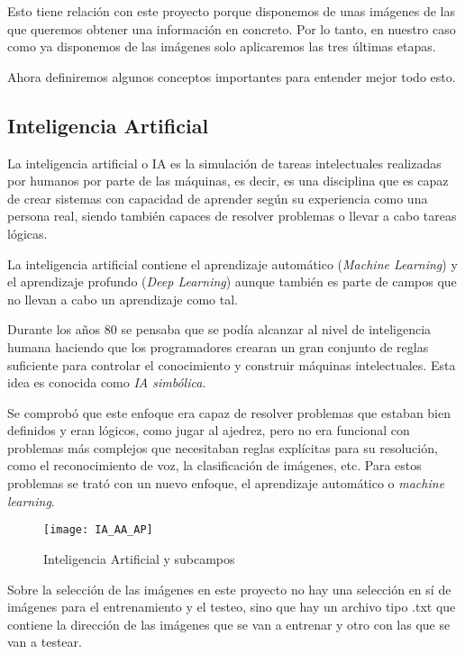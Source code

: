 Esto tiene relación con este proyecto porque disponemos de unas imágenes de las que queremos obtener una información en concreto. Por lo tanto, en nuestro caso como ya disponemos de las imágenes solo aplicaremos las tres últimas etapas.

Ahora definiremos algunos conceptos importantes para entender mejor todo esto.

\subsection{Inteligencia Artificial}

La inteligencia artificial o IA es la simulación de tareas intelectuales realizadas por humanos por parte de las máquinas, es decir, es una disciplina que es capaz de crear sistemas con capacidad de aprender según su experiencia como una persona real, siendo también capaces de resolver problemas o llevar a cabo tareas lógicas.

La inteligencia artificial contiene el aprendizaje automático (\textit{Machine Learning}) y el aprendizaje profundo (\textit{Deep Learning}) aunque también es parte de campos que no llevan a cabo un aprendizaje como tal.

Durante los años 80 se pensaba que se podía alcanzar al nivel de inteligencia humana haciendo que los programadores crearan un gran conjunto de reglas suficiente para controlar el conocimiento y construir máquinas intelectuales. Esta idea es conocida como \textit{IA simbólica}.

Se comprobó que este enfoque era capaz de resolver problemas que estaban bien definidos y eran lógicos, como jugar al ajedrez, pero no era funcional con problemas más complejos que necesitaban reglas explícitas para su resolución, como el reconocimiento de voz, la clasificación de imágenes, etc. Para estos problemas se trató con un nuevo enfoque, el aprendizaje automático o \textit{machine learning}.

\begin{figure}[htb]
	\centering
	\texttt{[image: IA\_AA\_AP]}
	\caption[Inteligencia Artificial y subcampos]{Inteligencia Artificial y subcampos \cite{MD:aprendizajeautomatico}}
\end{figure}


Sobre la selección de las imágenes en este proyecto no hay una selección en sí de imágenes para el entrenamiento y el testeo, sino que hay un archivo tipo .txt que contiene la dirección de las imágenes que se van a entrenar y otro con las que se van a testear.

